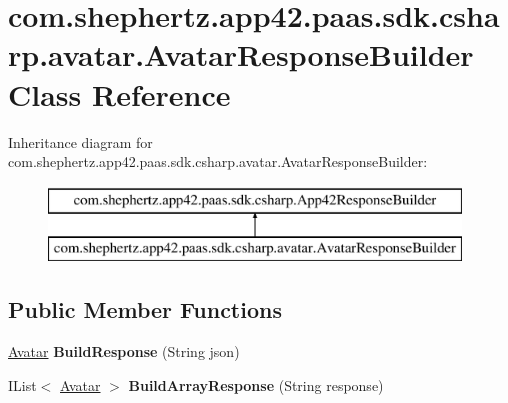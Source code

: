 \hypertarget{classcom_1_1shephertz_1_1app42_1_1paas_1_1sdk_1_1csharp_1_1avatar_1_1_avatar_response_builder}{\section{com.\+shephertz.\+app42.\+paas.\+sdk.\+csharp.\+avatar.\+Avatar\+Response\+Builder Class Reference}
\label{classcom_1_1shephertz_1_1app42_1_1paas_1_1sdk_1_1csharp_1_1avatar_1_1_avatar_response_builder}
}
Inheritance diagram for com.\+shephertz.\+app42.\+paas.\+sdk.\+csharp.\+avatar.\+Avatar\+Response\+Builder\+:\begin{figure}[H]
\begin{center}
\leavevmode
\includegraphics[height=2.000000cm]{classcom_1_1shephertz_1_1app42_1_1paas_1_1sdk_1_1csharp_1_1avatar_1_1_avatar_response_builder}
\end{center}
\end{figure}
\subsection*{Public Member Functions}
\begin{DoxyCompactItemize}
\item 
\hypertarget{classcom_1_1shephertz_1_1app42_1_1paas_1_1sdk_1_1csharp_1_1avatar_1_1_avatar_response_builder_add0dff044e45112a5902c4299c084a6e}{\hyperlink{classcom_1_1shephertz_1_1app42_1_1paas_1_1sdk_1_1csharp_1_1avatar_1_1_avatar}{Avatar} {\bfseries Build\+Response} (String json)}\label{classcom_1_1shephertz_1_1app42_1_1paas_1_1sdk_1_1csharp_1_1avatar_1_1_avatar_response_builder_add0dff044e45112a5902c4299c084a6e}

\item 
\hypertarget{classcom_1_1shephertz_1_1app42_1_1paas_1_1sdk_1_1csharp_1_1avatar_1_1_avatar_response_builder_a608cce100b19a1de5821b4a8e068fc37}{I\+List$<$ \hyperlink{classcom_1_1shephertz_1_1app42_1_1paas_1_1sdk_1_1csharp_1_1avatar_1_1_avatar}{Avatar} $>$ {\bfseries Build\+Array\+Response} (String response)}\label{classcom_1_1shephertz_1_1app42_1_1paas_1_1sdk_1_1csharp_1_1avatar_1_1_avatar_response_builder_a608cce100b19a1de5821b4a8e068fc37}

\end{DoxyCompactItemize}
